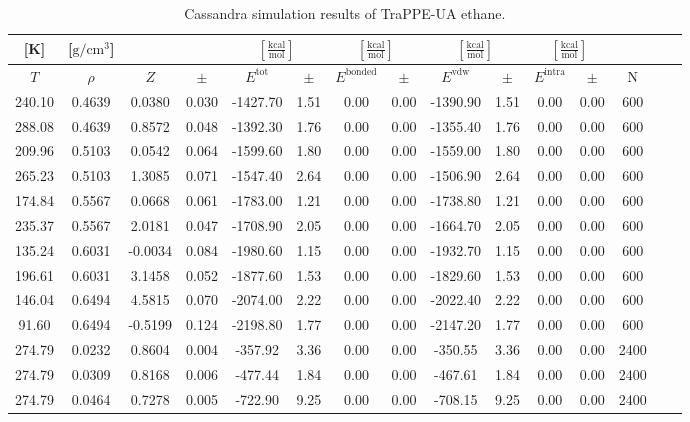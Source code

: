 \documentclass[%
 aip,
 jcp,
 sd,%
 amsmath,amssymb,
]{revtex4-1}
\begin{document}
\begin{table*}[!htbp]
\centering
\caption{Cassandra simulation results of TraPPE-UA ethane.}
\label{tab:sim-res-TraPPE-ethane}
\begin{ruledtabular}
\begin{tabular}{ccccccccccccccc}
[K] & [$\mathrm{g/cm^3}$] &  &  & \multicolumn{2}{c}{$[\frac{\mathrm{kcal}}{\mathrm{mol}}]$} & \multicolumn{2}{c}{$[\frac{\mathrm{kcal}}{\mathrm{mol}}]$} & \multicolumn{2}{c}{$[\frac{\mathrm{kcal}}{\mathrm{mol}}]$} &\multicolumn{2}{c}{$[\frac{\mathrm{kcal}}{\mathrm{mol}}]$} & \\
\hline
$T$ & $\rho$ & $Z$ & $\pm$ & $E^{\mathrm{tot}}$ & $\pm$ & $E^{\mathrm{bonded}}$ & $\pm$ & $E^{\mathrm{vdw}}$ & $\pm$ & $E^{\mathrm{intra}}$ & $\pm$ & N\\
\hline
240.10	&	0.4639	&	0.0380	&	0.030	&	-1427.70	&	1.51	&	0.00	&	0.00	&	-1390.90	&	1.51	&	0.00	&	0.00	&	600	\\
288.08	&	0.4639	&	0.8572	&	0.048	&	-1392.30	&	1.76	&	0.00	&	0.00	&	-1355.40	&	1.76	&	0.00	&	0.00	&	600	\\
209.96	&	0.5103	&	0.0542	&	0.064	&	-1599.60	&	1.80	&	0.00	&	0.00	&	-1559.00	&	1.80	&	0.00	&	0.00	&	600	\\
265.23	&	0.5103	&	1.3085	&	0.071	&	-1547.40	&	2.64	&	0.00	&	0.00	&	-1506.90	&	2.64	&	0.00	&	0.00	&	600	\\
174.84	&	0.5567	&	0.0668	&	0.061	&	-1783.00	&	1.21	&	0.00	&	0.00	&	-1738.80	&	1.21	&	0.00	&	0.00	&	600	\\
235.37	&	0.5567	&	2.0181	&	0.047	&	-1708.90	&	2.05	&	0.00	&	0.00	&	-1664.70	&	2.05	&	0.00	&	0.00	&	600	\\
135.24	&	0.6031	&	-0.0034	&	0.084	&	-1980.60	&	1.15	&	0.00	&	0.00	&	-1932.70	&	1.15	&	0.00	&	0.00	&	600	\\
196.61	&	0.6031	&	3.1458	&	0.052	&	-1877.60	&	1.53	&	0.00	&	0.00	&	-1829.60	&	1.53	&	0.00	&	0.00	&	600	\\
146.04	&	0.6494	&	4.5815	&	0.070	&	-2074.00	&	2.22	&	0.00	&	0.00	&	-2022.40	&	2.22	&	0.00	&	0.00	&	600	\\
91.60	&	0.6494	&	-0.5199	&	0.124	&	-2198.80	&	1.77	&	0.00	&	0.00	&	-2147.20	&	1.77	&	0.00	&	0.00	&	600	\\
274.79	&	0.0232	&	0.8604	&	0.004	&	-357.92	&	3.36	&	0.00	&	0.00	&	-350.55	&	3.36	&	0.00	&	0.00	&	2400	\\
274.79	&	0.0309	&	0.8168	&	0.006	&	-477.44	&	1.84	&	0.00	&	0.00	&	-467.61	&	1.84	&	0.00	&	0.00	&	2400	\\
274.79	&	0.0464	&	0.7278	&	0.005	&	-722.90	&	9.25	&	0.00	&	0.00	&	-708.15	&	9.25	&	0.00	&	0.00	&	2400	\\

\end{tabular}
\end{ruledtabular}
\end{table*}
\end{document}
